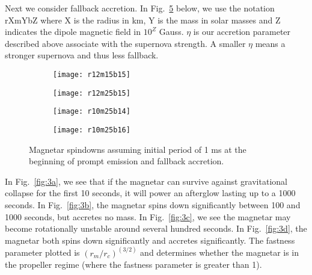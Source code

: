 \documentclass{article}
\begin{document}
Next we consider fallback accretion. In Fig.~\ref{fig:4} below, we use the notation rXmYbZ where X is the radius in km, Y is the mass in solar masses and Z indicates the dipole magnetic field in $10^Z$ Gauss. $\eta$ is our accretion parameter described above associate with the supernova strength. A smaller $\eta$ means a stronger supernova and thus less fallback.
\begin{figure}[h!]
\centering
\begin{subfigure}{.5\textwidth}
    \centering
    \texttt{[image: r12m15b15]}
    \caption{}
    \label{fig:4a}
\end{subfigure}%
\begin{subfigure}{.5\textwidth}
    \centering
    \texttt{[image: r12m25b15]}
    \caption{}
    \label{fig:4b}
\end{subfigure}
\begin{subfigure}{.5\textwidth}
    \centering
    \texttt{[image: r10m25b14]}
    \caption{}
    \label{fig:4c}
\end{subfigure}%
\begin{subfigure}{.5\textwidth}
    \centering
    \texttt{[image: r10m25b16]}
    \caption{}
    \label{fig:4c}
\end{subfigure}
\caption{Magnetar spindowns assuming initial period of 1 ms at the beginning of prompt emission and fallback accretion.}
\label{fig:4}
\end{figure}

In Fig.~\ref{fig:3a}, we see that if the magnetar can survive against gravitational collapse for the first 10 seconds, it will power an afterglow lasting up to a 1000 seconds. In Fig.~\ref{fig:3b}, the magnetar spins down significantly between 100 and 1000 seconds, but accretes no mass. In Fig.~\ref{fig:3c}, we see the magnetar may become rotationally unstable around several hundred seconds. In Fig.~\ref{fig:3d}, the magnetar both spins down significantly and accretes significantly. The fastness parameter plotted is $(r_m/r_c)^(3/2)$ and determines whether the magnetar is in the propeller regime (where the fastness parameter is greater than 1).
\newpage
\end{document}

